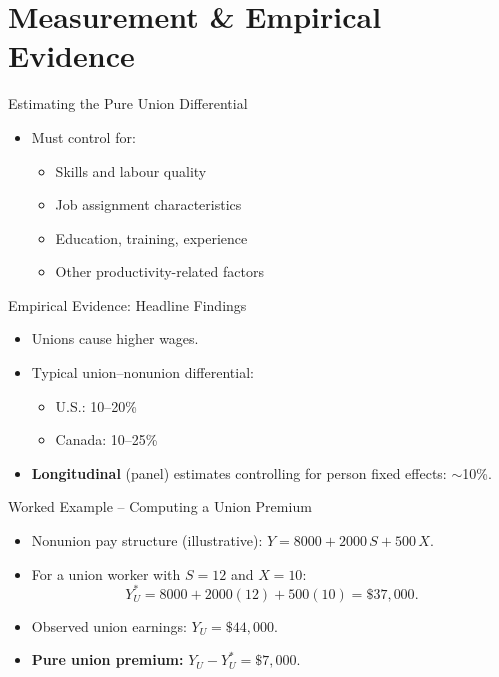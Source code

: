 \documentclass[aspectratio=169]{beamer}
\begin{document}
\section{Measurement \& Empirical Evidence}

\begin{frame}{Estimating the Pure Union Differential}
\transfade
\begin{itemize}[<+->]
  \item Must control for:
    \begin{itemize}[<+->]
      \item Skills and labour quality
      \item Job assignment characteristics
      \item Education, training, experience
      \item Other productivity-related factors
    \end{itemize}
\end{itemize}
\end{frame}

\begin{frame}{Empirical Evidence: Headline Findings}
\transfade
\begin{itemize}[<+->]
  \item Unions cause higher wages.
  \item Typical union--nonunion differential:
    \begin{itemize}[<+->]
      \item U.S.: 10--20\%
      \item Canada: 10--25\%
    \end{itemize}
  \item \textbf{Longitudinal} (panel) estimates controlling for person fixed effects: $\sim$10\%.
\end{itemize}
\end{frame}

\begin{frame}{Worked Example -- Computing a Union Premium}
\transfade
\small
\begin{itemize}[<+->]
  \item Nonunion pay structure (illustrative): $Y = 8000 + 2000\,S + 500\,X$.
  \item For a union worker with $S=12$ and $X=10$:
\[
Y_U^\ast = 8000 + 2000(12) + 500(10) = \$37{,}000.
\]
  \item Observed union earnings: $Y_U = \$44{,}000$.
  \item \textbf{Pure union premium:} $Y_U - Y_U^\ast = \$7{,}000$.
\end{itemize}
\end{frame}
\end{document}
